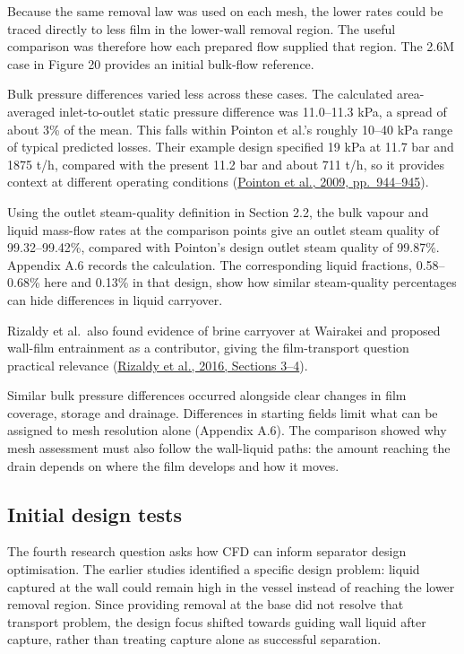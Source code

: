 \documentclass[12pt]{article}
\begin{document}
Because the same removal law was used on each mesh, the lower rates could be traced directly to less film in the lower-wall removal region. The useful comparison was therefore how each prepared flow supplied that region. The 2.6M case in Figure 20 provides an initial bulk-flow reference.

Bulk pressure differences varied less across these cases. The calculated area-averaged inlet-to-outlet static pressure difference was 11.0--11.3 kPa, a spread of about 3\% of the mean. This falls within Pointon et al.'s roughly 10--40 kPa range of typical predicted losses. Their example design specified 19 kPa at 11.7 bar and 1875 t/h, compared with the present 11.2 bar and about 711 t/h, so it provides context at different operating conditions (\href{https://publications.mygeoenergynow.org/grc/1028587.pdf}{Pointon et al., 2009, pp.~944--945}).

Using the outlet steam-quality definition in Section 2.2, the bulk vapour and liquid mass-flow rates at the comparison points give an outlet steam quality of 99.32--99.42\%, compared with Pointon's design outlet steam quality of 99.87\%. Appendix A.6 records the calculation. The corresponding liquid fractions, 0.58--0.68\% here and 0.13\% in that design, show how similar steam-quality percentages can hide differences in liquid carryover.

Rizaldy et al.~also found evidence of brine carryover at Wairakei and proposed wall-film entrainment as a contributor, giving the film-transport question practical relevance (\href{https://www.researchgate.net/publication/310818568_LIQUID_CARRYOVER_IN_GEOTHERMAL_STEAM-WATER_SEPARATORS}{Rizaldy et al., 2016, Sections 3--4}).

Similar bulk pressure differences occurred alongside clear changes in film coverage, storage and drainage. Differences in starting fields limit what can be assigned to mesh resolution alone (Appendix A.6). The comparison showed why mesh assessment must also follow the wall-liquid paths: the amount reaching the drain depends on where the film develops and how it moves.

\subsection{Initial design tests}\label{initial-design-tests}

The fourth research question asks how CFD can inform separator design optimisation. The earlier studies identified a specific design problem: liquid captured at the wall could remain high in the vessel instead of reaching the lower removal region. Since providing removal at the base did not resolve that transport problem, the design focus shifted towards guiding wall liquid after capture, rather than treating capture alone as successful separation.
\end{document}
